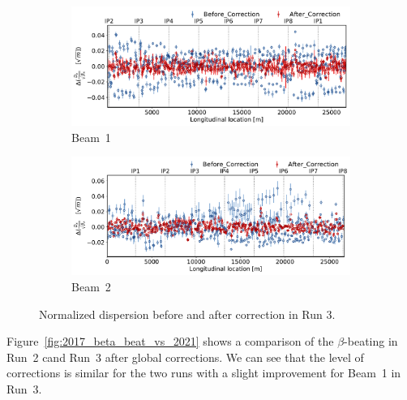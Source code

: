 \documentclass[a4paper]{cernatsnote}
\begin{document}
\begin{figure}[ht]
\begin{subfigure}{.5\textwidth}
  \centering
  \includegraphics[width=.99\linewidth]{plots/beam1/Normalized_disp_before_vs_after_corection.pdf}  
  \caption{Beam~1}
\end{subfigure}
\begin{subfigure}{.5\textwidth}
  \centering
  \includegraphics[width=.99\linewidth]{plots/beam2/ndisp_before_after_correction.pdf}  
  \caption{Beam~2}
\end{subfigure}
\caption{Normalized dispersion before and after correction in Run 3.}
\label{fig:before_after_correction_ndisp}
\end{figure}

Figure~\ref{fig:2017_beta_beat_vs_2021} shows a comparison of the $\beta$-beating in Run~2 cand Run~3 after global corrections. We can see that the level of corrections is similar for the two runs with a slight improvement for Beam~1 in Run~3. 
\end{document}
